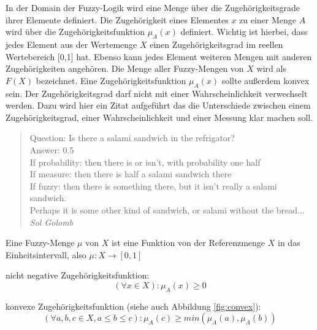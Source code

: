 \documentclass[12pt,a4paper,bibliography=totocnumbered,listof=totocnumbered, abstracton]{scrartcl}
\theoremstyle{Umgebung}
\begin{document}
In der Domain der Fuzzy-Logik wird eine Menge über die Zugehörigkeitsgrade ihrer Elemente definiert. Die Zugehörigkeit eines Elementes $x$ zu einer Menge $A$ wird über die Zugehörigkeitsfunktion $\mu_A(x)$ definiert. Wichtig ist hierbei, dass jedes Element aus der Wertemenge $X$ einen Zugehörigkeitsgrad im reellen Wertebereich [0,1] hat. Ebenso kann jedes Element weiteren Mengen mit anderen Zugehörigkeiten angehören. Die Menge aller Fuzzy-Mengen von $X$ wird als $F(X)$ bezeichnet. Eine Zugehörigkeitsfunktion $\mu_A(x)$ sollte außerdem konvex sein. Der Zugehörigkeitsgrad darf nicht mit einer Wahrscheinlichkeit verwechselt werden. Dazu wird hier ein Zitat aufgeführt das die Unterschiede zwischen einem Zugehörigkeitsgrad, einer Wahrscheinlichkeit und einer Messung klar machen soll.

\begin{quote}
Question: Is there a salami sandwich in the refrigator? \\
Answer: 0.5 \\
If probability: then there is or isn’t, with probability one half \\
If measure: then there is half a salami sandwich there \\
If fuzzy: then there is something there, but it isn’t really a salami sandwich. \\
Perhaps it is some other kind of sandwich, or salami without the bread... \\
\emph{Sol Golomb}
\end{quote}

\begin{defnt}
Eine Fuzzy-Menge $\mu$ von $X$ ist eine Funktion von der Referenzmenge
$X$ in das Einheitsintervall, also $\mu : X \rightarrow \left [0,1\right]$
\end{defnt}


\begin{defnt}
	nicht negative Zugehörigkeitsfunktion:
	\begin{equation}
	(\forall x \in X): \mu_A(x) \geq 0
	\end{equation}
\end{defnt}


\begin{defnt}
	konvexe Zugehörigkeitsfunktion (siehe auch Abbildung \ref{fig:convex}):
	\begin{equation}
		(\forall a,b,c \in X, a \le b \le c): \mu_A(c) \geq min(\mu_A(a), \mu_A(b)) 
	\end{equation}
	
\end{defnt}
\end{document}
